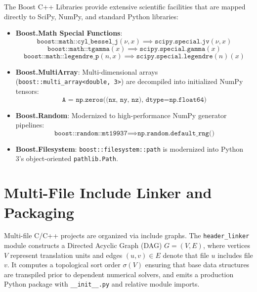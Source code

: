 \documentclass[11pt,a4paper]{article}
\theoremstyle{definition}
\begin{document}
The Boost C++ Libraries provide extensive scientific facilities that are mapped directly to SciPy, NumPy, and standard Python libraries:
\begin{itemize}
    \item \textbf{Boost.Math Special Functions}:
    \begin{equation}
        \texttt{boost::math::cyl\_bessel\_j}(\nu, x) \implies \texttt{scipy.special.jv}(\nu, x)
    \end{equation}
    \begin{equation}
        \texttt{boost::math::tgamma}(x) \implies \texttt{scipy.special.gamma}(x)
    \end{equation}
    \begin{equation}
        \texttt{boost::math::legendre\_p}(n, x) \implies \texttt{scipy.special.legendre}(n)(x)
    \end{equation}
    \item \textbf{Boost.MultiArray}: Multi-dimensional arrays (\texttt{boost::multi\_array<double, 3>}) are decompiled into initialized NumPy tensors:
    \begin{equation}
        \texttt{A = np.zeros((nx, ny, nz), dtype=np.float64)}
    \end{equation}
    \item \textbf{Boost.Random}: Modernized to high-performance NumPy generator pipelines:
    \begin{equation}
        \texttt{boost::random::mt19937} \implies \texttt{np.random.default\_rng()}
    \end{equation}
    \item \textbf{Boost.Filesystem}: \texttt{boost::filesystem::path} is modernized into Python 3's object-oriented \texttt{pathlib.Path}.
\end{itemize}

\section{Multi-File Include Linker and Packaging}

Multi-file C/C++ projects are organized via include graphs. The \texttt{header\_linker} module constructs a Directed Acyclic Graph (DAG) $G = (V, E)$, where vertices $V$ represent translation units and edges $(u, v) \in E$ denote that file $u$ includes file $v$. It computes a topological sort order $\sigma(V)$ ensuring that base data structures are transpiled prior to dependent numerical solvers, and emits a production Python package with \texttt{\_\_init\_\_.py} and relative module imports.
\end{document}
